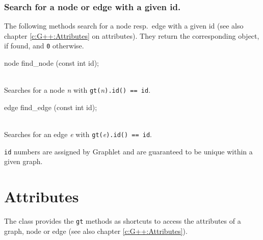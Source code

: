 \documentclass[twoside,fleqn]{report}
\begin{document}
\subsubsection{Search for a node or edge with a given id.}
 
The following methods search for a node resp.\ edge with a given
id (see also chapter \ref{c:G++:Attributes} on attributes). They
return the corresponding object, if found, and \texttt{0}
otherwise.

\begin{Cdefinition}

  \item[node find\_node (const int id);] \strut\\
  Searches for a node \emph{n} with \verb|gt(|\emph{n}\verb|).id() == id|.

  \item[edge find\_edge (const int id);] \strut\\
  Searches for an edge \emph{e} with \verb|gt(|\emph{e}\verb|).id() == id|.

\end{Cdefinition}

\begin{notes}
  
  \item \texttt{id} numbers are assigned by Graphlet and are
  guaranteed to be unique within a given graph.

\end{notes}

%
%

\section{ Attributes}
\label{s:GraphAttributes}

The class  provides the \texttt{gt} methods as
shortcuts to access the attributes of a graph, node or edge (see
also chapter \ref{c:G++:Attributes}).
\end{document}
